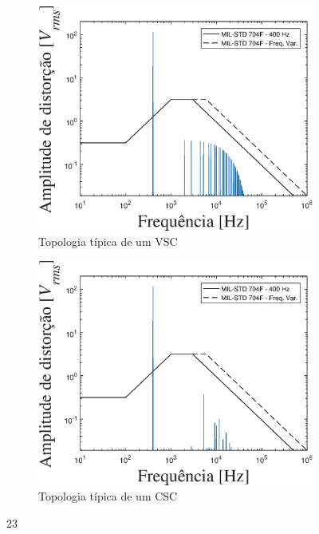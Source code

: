 \begin{figure}[!htb] %
	\centering
	\begin{subfigure}[b]{0.48\textwidth}
		\centering
		\includegraphics[width=\textwidth]{Cap4/Figuras/resultados_unfilt_23.eps}
		\caption{Topologia típica de um VSC} 
		\label{fig:resultados_unfilt_23.eps}
	\end{subfigure}%
		\hfill
	\begin{subfigure}[b]{0.48\textwidth}  
		\centering 
		\includegraphics[width=\textwidth]{Cap4/Figuras/resultados_filt_23.eps}
		\caption{Topologia típica de um CSC}    
		\label{fig:resultados_filt_23.eps}
	\end{subfigure}%
	\caption{23}
	\label{fig:23}
\end{figure}

